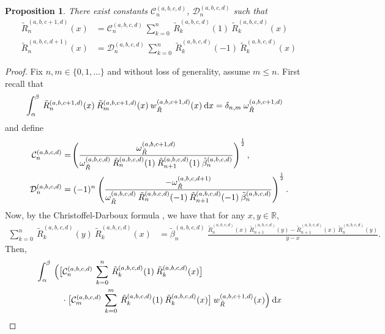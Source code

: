 \documentclass[11pt, oneside]{article}   	%
\newcommand{\bstodo}{\todo[color=pink]}
\newcommand{\half}{\frac{1}{2}}
\newcommand{\R}{\mathbb{R}}
\newcommand{\genjac}{R}
\newcommand{\genjact}{\tilde{\genjac}}
\newcommand{\genjactw}{w_{\genjact}}
\newcommand{\normgenjact}{\omega_{\genjact}}
\newtheorem{proposition}{Proposition}
\begin{document}
\begin{proposition}
There exist constants $\mathcal{C}_n^{(a,b,c,d)}$, $\mathcal{D}_n^{(a,b,c,d)}$ such that
\begin{align}
	\genjact_n^{(a,b,c+1,d)}(x) &= \mathcal{C}_n^{(a,b,c,d)} \: \sum_{k=0}^n \: \genjact_{k}^{(a,b,c,d)}(1) \: \genjact_{k}^{(a,b,c,d)}(x) \label{eqn:genjacexpansioni} \\
	\genjact_n^{(a,b,c,d+1)}(x) &= \mathcal{D}_n^{(a,b,c,d)} \: \sum_{k=0}^n \: \genjact_{k}^{(a,b,c,d)}(-1) \: \genjact_{k}^{(a,b,c,d)}(x) \label{eqn:genjacexpansionii}
\end{align}
\end{proposition}

\begin{proof}
Fix $n,m \in \{0,1,\dots\}$ and without loss of generality, assume $m \le n$. First recall that
\begin{align*}
	\int_\alpha^\beta \: \genjact_n^{(a,b,c+1,d)}(x) \: \genjact_m^{(a,b,c+1,d)}(x) \: \genjactw^{(a,b,c+1,d)}(x) \: \D x &= \delta_{n,m} \: \normgenjact^{(a,b,c+1,d)}
\end{align*}
and define \bstodo{check signs}
\begin{align}
	\mathcal{C}_n^{(a,b,c,d)} &= \fpr(\frac{\normgenjact^{(a,b,c+1,d)}}{\normgenjact^{(a,b,c,d)} \: \genjact_n^{(a,b,c,d)}(1) \: \genjact_{n+1}^{(a,b,c,d)}(1) \: \tilde{\beta}_n^{(a,b,c,d)}})^\half, \label{eqn:genjactnormalisationi} \\
	\mathcal{D}_n^{(a,b,c,d)} &= (-1)^n \: \fpr(\frac{- \normgenjact^{(a,b,c,d+1)}}{\normgenjact^{(a,b,c,d)} \: \genjact_n^{(a,b,c,d)}(-1) \: \genjact_{n+1}^{(a,b,c,d)}(-1) \: \tilde{\beta}_n^{(a,b,c,d)}})^\half. \label{eqn:genjactnormalisationii}
\end{align}
Now, by the Christoffel-Darboux formula \bstodo{cite}, we have that for any $x, y \in \R$,
\begin{align}
	\sum_{k=0}^n \: \genjact_{k}^{(a,b,c,d)}(y) \: \genjact_{k}^{(a,b,c,d)}(x) &= \tilde{\beta}_n^{(a,b,c,d)} \: \frac{\genjact_{n}^{(a,b,c,d)}(x) \: \genjact_{n+1}^{(a,b,c,d)}(y) - \genjact_{n+1}^{(a,b,c,d)}(x) \: \genjact_{n}^{(a,b,c,d)}(y)}{y - x}. \label{eqn:christoffeldarboux}
\end{align}
Then,
\begin{align*}
	&\int_\alpha^\beta \: \Big(\big[\mathcal{C}_n^{(a,b,c,d)} \: \sum_{k=0}^n \: \genjact_{k}^{(a,b,c,d)}(1) \: \genjact_{k}^{(a,b,c,d)}(x)\big] \\
	&\quad \quad \quad \cdot \big[\mathcal{C}_m^{(a,b,c,d)} \: \sum_{k=0}^m \: \genjact_{k}^{(a,b,c,d)}(1) \: \genjact_{k}^{(a,b,c,d)}(x)\big] \: \genjactw^{(a,b,c+1,d)}(x) \Big) \: \D x \\

\end{align*}
\end{proof}
\end{document}
